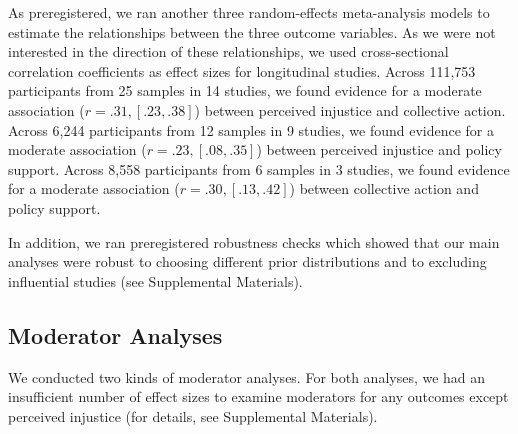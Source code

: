\documentclass[twocolumn, 11pt, letterpaper]{article}
\begin{document}
As preregistered, we ran another three random-effects meta-analysis
models to estimate the relationships between the three outcome
variables. As we were not interested in the direction of these
relationships, we used cross-sectional correlation coefficients as
effect sizes for longitudinal studies. Across 111,753 participants from
25 samples in 14 studies, we found evidence for a moderate association
(\(r = .31, [.23, .38]\)) between perceived injustice and collective
action. Across 6,244 participants from 12 samples in 9 studies, we found
evidence for a moderate association (\(r = .23, [.08, .35]\)) between
perceived injustice and policy support. Across 8,558 participants from 6
samples in 3 studies, we found evidence for a moderate association
(\(r = .30, [.13, .42]\)) between collective action and policy support.

In addition, we ran preregistered robustness checks which showed that
our main analyses were robust to choosing different prior distributions
and to excluding influential studies (see Supplemental Materials).

\hypertarget{moderator-analyses}{%
\subsection{Moderator Analyses}\label{moderator-analyses}}

We conducted two kinds of moderator analyses. For both analyses, we had
an insufficient number of effect sizes to examine moderators for any
outcomes except perceived injustice (for details, see Supplemental
Materials).
\end{document}
